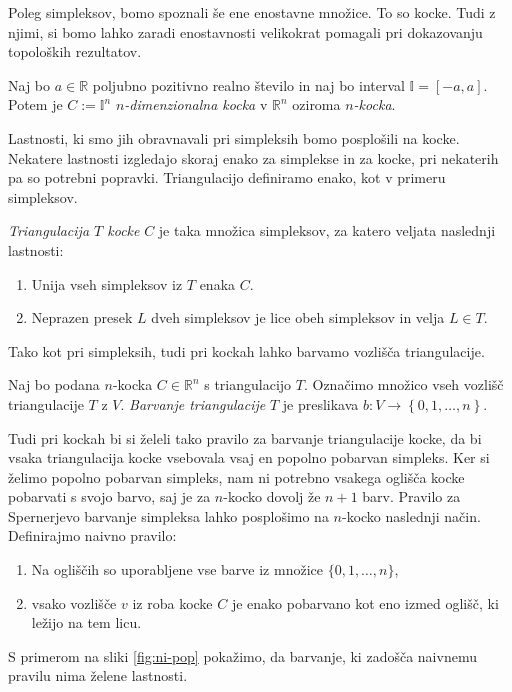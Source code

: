 \documentclass[mat1]{fmfdelo}
\newcommand{\R}{\mathbb R}
\newcommand{\I}{\mathbb I}
\newcommand{\0}{\underline{0}}
\begin{document}
Poleg simpleksov, bomo spoznali še ene enostavne množice. To so kocke. Tudi z njimi, si bomo lahko zaradi enostavnosti velikokrat pomagali pri dokazovanju topoloških rezultatov. 
\begin{definicija}
Naj bo $a \in \R$ poljubno pozitivno realno število in naj bo interval $\I = \left [ -a, a \right ] $. Potem je $C := \I^n$ \emph{$n$-dimenzionalna kocka} v $\R^n$ oziroma \emph{$n$-kocka}.
\end{definicija}
Lastnosti, ki smo jih obravnavali pri simpleksih bomo posplošili na kocke. Nekatere lastnosti izgledajo skoraj enako za simplekse in za kocke, pri nekaterih pa so potrebni popravki.
Triangulacijo definiramo enako, kot v primeru simpleksov.
\begin{definicija}
\emph{Triangulacija $T$ kocke} $C$ je taka množica simpleksov, za katero veljata naslednji lastnosti:
\begin{enumerate}
\item Unija vseh simpleksov iz $T$ enaka $C$.
\item Neprazen presek $L$ dveh simpleksov je lice obeh simpleksov in velja $L \in T$.
\end{enumerate}
\end{definicija}
Tako kot pri simpleksih, tudi pri kockah lahko barvamo vozlišča triangulacije.
\begin{definicija}
Naj bo podana $n$-kocka $C \in \R^n$ s triangulacijo $T$. Označimo množico vseh vozlišč triangulacije $T$ z $V$. \emph{Barvanje triangulacije} $T$ je preslikava $b : V \to \left \{0, 1, \dots, n \right \}$.
\end{definicija}
Tudi pri kockah bi si želeli tako pravilo za barvanje triangulacije kocke, da bi vsaka triangulacija kocke vsebovala vsaj en popolno pobarvan simpleks. Ker si želimo popolno pobarvan simpleks, nam ni potrebno vsakega oglišča kocke pobarvati s svojo barvo, saj je za $n$-kocko dovolj že $n+1$ barv.  Pravilo za Spernerjevo barvanje simpleksa lahko posplošimo na $n$-kocko naslednji način.
Definirajmo naivno pravilo:
\begin{enumerate}
\item Na ogliščih so uporabljene vse barve iz množice $\{0, 1, \dots, n \}$,
\item vsako vozlišče $v$ iz roba kocke $C$ je enako pobarvano kot eno izmed oglišč, ki ležijo na tem licu.
\end{enumerate}
S primerom na sliki \ref{fig:ni-pop} pokažimo, da barvanje, ki zadošča naivnemu pravilu nima želene lastnosti.
\end{document}
